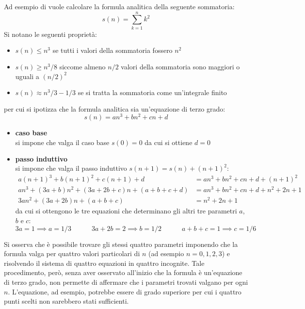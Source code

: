 Ad esempio di vuole calcolare la formula analitica della seguente sommatoria:
\[s(n) = \sum_{k=1}^{n} k^2\]
Si notano le seguenti proprietà:
\begin{itemize}
	\item \(s(n) \leq n^3\) se tutti i valori della sommatoria fossero \(n^2\)
	\item \(s(n) \geq n^3 / 8\) siccome almeno \(n / 2\) valori della sommatoria sono maggiori o uguali a \((n / 2)^2\)
	\item \(s(n) \approx n^3 / 3 - 1/3\) se si tratta la sommatoria come un'integrale finito
\end{itemize}
per cui si ipotizza che la formula analitica sia un'equazione di terzo grado:
\[s(n) = a n^3 + b n^2 + c n + d\]

\begin{itemize}
	\item \textbf{caso base} \\
	si impone che valga il caso base \(s(0) = 0\) da cui si ottiene \(d = 0\)
	\item \textbf{passo induttivo} \\
	si impone che valga il passo induttivo \(s(n + 1) = s(n) + (n + 1)^2\):
\begin{align*}
	a (n + 1)^3 + b (n + 1)^2 + c (n + 1) + d & = a n^3 + b n^2 + c n + d + (n + 1)^2 \\
	a n^3 + (3 a + b) n^2 + (3 a + 2 b + c) n + (a + b + c + d) & = a n^3 + b n^2 + c n + d + n^2 + 2 n + 1 \\
	3a n^2 + (3 a + 2 b) n + (a + b + c) & = n^2 + 2 n + 1
\end{align*}
da cui si ottengono le tre equazioni che determinano gli altri tre parametri \(a\), \(b\) e \(c\):
\[3a = 1 \implies a = 1/3 \qquad\quad 3a + 2b = 2 \implies b = 1/2 \qquad\quad a + b + c = 1 \implies c = 1/6\]
\end{itemize}

\noindent
Si osserva che è possibile trovare gli stessi quattro parametri imponendo che la formula valga per quattro valori
particolari di \(n\) (ad esempio \(n = 0, 1, 2, 3\)) e risolvendo il sistema di quattro equazioni in quattro incognite.
Tale procedimento, però, senza aver osservato all'inizio che la formula è un'equazione di terzo grado, non permette di
affermare che i parametri trovati valgano per ogni \(n\). L'equazione, ad esempio, potrebbe essere di grado superiore
per cui i quattro punti scelti non sarebbero stati sufficienti.

